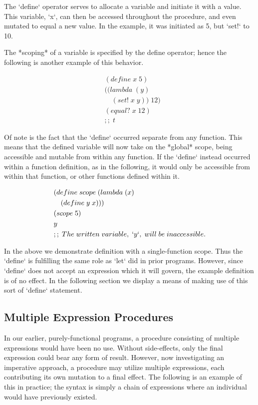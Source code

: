 \documentclass[11pt]{article}
\begin{document}
The `define` operator serves to allocate a variable and initiate it with a value. This variable, `x`, can then be accessed throughout the procedure, and even mutated to equal a new value. In the example, it was initiated as 5, but `set!` to 10.

The *scoping* of a variable is specified by the define operator; hence the following is another example of this behavior.

\begin{align*}
& (define \; x \; 5)
\\& ((lambda \; (y)
\\& \quad (set! \; x \; y)) \; 12)
\\& (equal? \; x \; 12) \; 
\\& ;; \; t
\end{align*}

Of note is the fact that the `define` occurred separate from any function. This means that the defined variable will now take on the *global* scope, being accessible and mutable from within any function. If the `define` instead occurred within a function definition, as in the following, it would only be accessible from within that function, or other functions defined within it.

\begin{align*}
& (define \; scope \; (lambda \; (x)
\\& \quad (define \; y \; x)))
\\& (scope \; 5)
\\& y
\\& ;; \; The \; written \; variable, \; `y`, \; will \; be \; inaccessible.
\end{align*}

In the above we demonstrate definition with a single-function scope. Thus the `define` is fulfilling the same role as `let` did in prior programs. However, since `define` does not accept an expression which it will govern, the example definition is of no effect. In the following section we display a means of making use of this sort of `define` statement.

\subsection{Multiple Expression Procedures}
In our earlier, purely-functional programs, a procedure consisting of multiple expressions would have been no use. Without side-effects, only the final expression could bear any form of result. However, now investigating an imperative approach, a procedure may utilize multiple expressions, each contributing its own mutation to a final effect. The following is an example of this in practice; the syntax is simply a chain of expressions where an individual would have previously existed.
\end{document}
